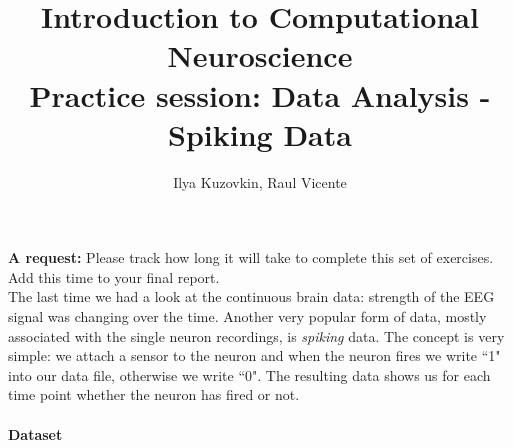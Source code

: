 \documentclass[a4paper,11pt]{article}
\author{\large{Ilya Kuzovkin, Raul Vicente}}
\title{\huge{Introduction to Computational Neuroscience}\\\LARGE{Practice session: Data Analysis - Spiking Data}}
\begin{document}
\maketitle

\textbf{A request:} Please track how long it will take to complete this set of exercises. Add this time to your final report.
\ \\

The last time we had a look at the continuous brain data: strength of the EEG signal was changing over the time. Another very popular form of data, mostly associated with the single neuron recordings, is \emph{spiking} data. The concept is very simple: we attach a sensor to the neuron and when the neuron fires we write ``1" into our data file, otherwise we write ``0". The resulting data shows us for each time point whether the neuron has fired or not.\\
\ \\
\textbf{Dataset}
\end{document}
